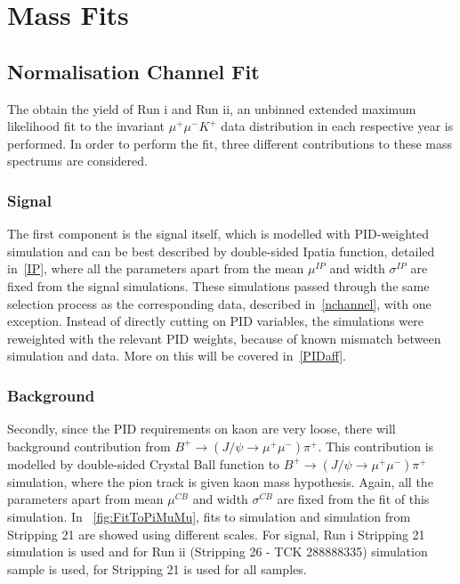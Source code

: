 \section{Mass Fits}

\subsection{Normalisation Channel Fit}


The obtain the \bjpsimumuk yield of Run \Rn{1} and Run \Rn{2}, an unbinned extended maximum likelihood fit to the invariant $\mu^{+} \mu^{-} K^{+}$ data distribution in each respective year is performed. In order to perform the fit, three different contributions to these mass spectrums are considered. 

\subsubsection{Signal}

The first component is the signal itself, which is modelled with PID-weighted simulation and can be best described by double-sided Ipatia function, detailed in~\autoref{IP}, where all the parameters apart from the mean $\mu^{IP}$ and width $\sigma^{IP}$ are fixed from the signal simulations. These simulations passed through the same selection process as the corresponding \bjpsimumuk data, described in~\autoref{nchannel}, with one exception. Instead of directly cutting on \gls{PID} variables, the simulations were reweighted with the relevant PID weights, because of known mismatch between simulation and data. More on this will be covered in~\autoref{PIDaff}. 


\subsubsection{\mb{\bjpsimumupi} Background}

Secondly, since the PID requirements on kaon are very loose, there will background contribution from $ B^{+} \rightarrow (J/\psi \rightarrow \mu^{+} \mu^{-}) \pi^{+}$. This contribution is modelled by double-sided Crystal Ball function to $B^{+} \rightarrow (J/\psi \rightarrow \mu^{+} \mu^{-}) \pi^{+}$ simulation, where the pion track is given kaon mass hypothesis. Again, all the parameters apart from mean $\mu^{CB}$ and width $\sigma^{CB}$ are fixed from the fit of this simulation. In ~\autoref{fig:FitToPiMuMu}, fits to \bjpsimumuk simulation and \bjpsimumupi simulation from Stripping 21 are showed using different scales.
For signal, Run \Rn{1} Stripping 21 simulation is used and for Run \Rn{2} (Stripping 26 - TCK 288888335) simulation sample is used, for \bjpsimumupi Stripping 21 is used for all samples.

